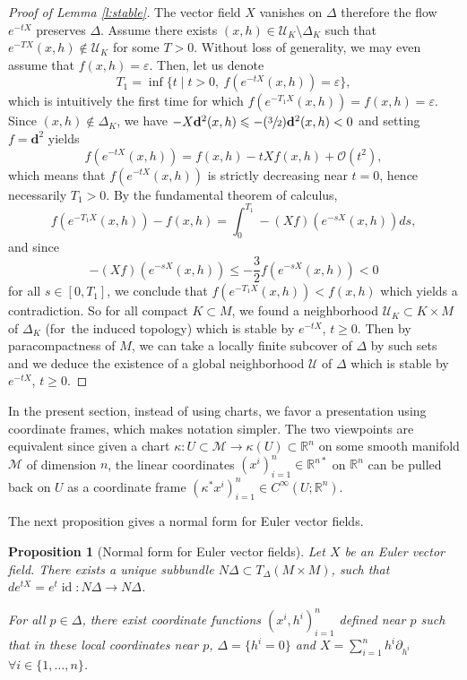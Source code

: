 \documentclass[JEP,XML,SOM,Unicode]{cedram}
\let\pazocal\mathscr
\newcommand{\Psfrac}[2]{(\sfrac{#1}{#2})}
\newtheorem{proposition}[theorem]{Proposition}
\theoremstyle{definition}
\newenvironment{refproof}[1]{\begin{proof}[Proof of {#1}]}{\end{proof}}
\let\st\mid
\let\euler X
\DeclareMathOperator\id{id}
\begin{document}
\begin{refproof}{Lemma \ref{l:stable}}
The vector field $\euler$ vanishes on $\Delta$ therefore the flow $e^{-t\euler}$
preserves $\Delta$.
Assume there exists $(x,h)\in \pazocal{U}_K\setminus \Delta_K$ such that $e^{-T\euler}(x,h)\notin \pazocal{U}_K$ for some $T> 0$.
Without loss of generality, we may even assume that $f(x,h)=\varepsilon$.
Then,
let us denote
\[
T_1=\inf\{t \st t>0,\ f(e^{-t\euler}(x,h))=\varepsilon \},
\]
which is intuitively
the first time for which $f(e^{-T_1\euler}(x,h))=f(x,h)=\varepsilon$.
Since $(x,h)\notin \Delta_K$, we have $-\euler \mathbf{d}^2(x,h)\leqslant -\Psfrac{3}{2} \mathbf{d}^2(x,h)<0$ and setting $f=\mathbf{d}^2$
yields
\[
f(e^{-t\euler}(x,h))=f(x,h)-t\euler f(x,h)+\pazocal{O} (t^2),
\]
which means that $f(e^{-t\euler}(x,h))$ is strictly decreasing near $t=0$, hence necessarily $T_1>0$. By the fundamental theorem of calculus,
\[
f(e^{-T_1\euler}(x,h))-f(x,h)=\int_0^{T_1} -{\left(\euler f\right)}(e^{-s\euler}(x,h))ds,
\]
and since
\[
-{\left(\euler f\right)}(e^{-s\euler}(x,h))\leqslant -\frac{3}{2}f(e^{-s\euler}(x,h)) <0
\]
for all $s\in [0,T_1]$, we conclude that
$f(e^{-T_1\euler}(x,h))<f(x,h)$ which yields a contradiction. So
for all compact $K\subset M$, we found a neighborhood $\pazocal{U}_K\subset K\times M$ of $\Delta_K$ (for~the induced topology) which is stable by $e^{-t\euler}$, $t\geqslant 0$. Then by paracompactness of $M$, we can take a locally finite subcover of $\Delta$ by such sets and we deduce the existence of a global neighborhood $\pazocal{U}$ of $\Delta$ which is stable by
$e^{-t\euler}$, $t\geqslant 0$.
\end{refproof}

In the present section, instead of using charts, we
favor a presentation using coordinate frames,
which makes notation
simpler. The two viewpoints are equivalent
since given a chart $\kappa:U\subset \pazocal{M}\to \kappa(U)\subset \mathbb{R}^n$ on some smooth manifold $\pazocal{M}$ of dimension $n$, the linear
coordinates $(x^i)_{i=1}^n \in \mathbb{R}^{n*}$ on $\mathbb{R}^n$ can be pulled back on
$U$ as a coordinate frame $(\kappa^*x^i)_{i=1}^n\in C^\infty(U;\mathbb{R}^n)$.

The next proposition gives a normal form for Euler vector fields.

\begin{proposition}[Normal form for Euler vector fields]\label{p:normalform}
Let $\euler$ be an Euler vector field. There exists a unique subbundle
$N\Delta\subset T_\Delta \left(M\times M\right)$, such that
$ de^{t\euler}=e^{t}\id: N\Delta\to N\Delta$.

For all $p\in \Delta$, there exist coordinate functions $(x^i,h^i)_{i=1}^n$ defined near $p$ such that in these local coordinates near $p$, $\Delta=\{h^i=0 \}$ and
$
\euler=\sum_{i=1}^n h^i\partial_{h^i}$ $\forall i\in \{1,\dots,n\}$.
\end{proposition}
\end{document}
